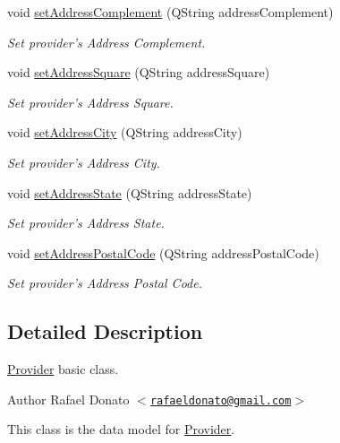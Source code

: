 \begin{DoxyCompactItemize}
void \hyperlink{class_provider_a33dceaa952335a240a8439a684f5697f}{set\-Address\-Complement} (\-Q\-String address\-Complement)
\begin{DoxyCompactList}\small\item\em \-Set provider's \-Address \-Complement. \end{DoxyCompactList}\item 
void \hyperlink{class_provider_a05ca576d3d372c30b96eac23d9394ae6}{set\-Address\-Square} (\-Q\-String address\-Square)
\begin{DoxyCompactList}\small\item\em \-Set provider's \-Address \-Square. \end{DoxyCompactList}\item 
void \hyperlink{class_provider_a7b7f588427a292e8768ffca0e18ebe7a}{set\-Address\-City} (\-Q\-String address\-City)
\begin{DoxyCompactList}\small\item\em \-Set provider's \-Address \-City. \end{DoxyCompactList}\item 
void \hyperlink{class_provider_aa3836f3c2944c8eabffc8b8d56c19902}{set\-Address\-State} (\-Q\-String address\-State)
\begin{DoxyCompactList}\small\item\em \-Set provider's \-Address \-State. \end{DoxyCompactList}\item 
void \hyperlink{class_provider_abf4a20301c48b964da475dc12c018c41}{set\-Address\-Postal\-Code} (\-Q\-String address\-Postal\-Code)
\begin{DoxyCompactList}\small\item\em \-Set provider's \-Address \-Postal \-Code. \end{DoxyCompactList}\end{DoxyCompactItemize}


\subsection{\-Detailed \-Description}
\hyperlink{class_provider}{\-Provider} basic class. 

\begin{DoxyAuthor}{\-Author}
\-Rafael \-Donato $<$\href{mailto:rafaeldonato@gmail.com}{\tt rafaeldonato@gmail.\-com}$>$
\end{DoxyAuthor}
\-This class is the data model for \hyperlink{class_provider}{\-Provider}. 

